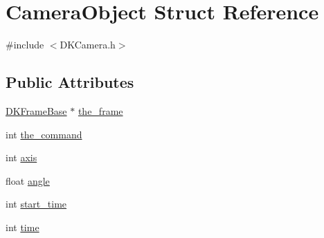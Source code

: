 \hypertarget{struct_camera_object}{\section{Camera\-Object Struct Reference}
\label{struct_camera_object}
}


{\ttfamily \#include $<$D\-K\-Camera.\-h$>$}

\subsection*{Public Attributes}
\begin{DoxyCompactItemize}
\item 
\hyperlink{class_d_k_frame_base}{D\-K\-Frame\-Base} $\ast$ \hyperlink{struct_camera_object_a1228779759d82950e5d15b6be7a060ab}{the\-\_\-frame}
\item 
int \hyperlink{struct_camera_object_aa190f23fb76e74c150b4ab9d8634d859}{the\-\_\-command}
\item 
int \hyperlink{struct_camera_object_acf2d2c620f1dadd7d066b93fc801723c}{axis}
\item 
float \hyperlink{struct_camera_object_ab02c981d766b44a1783be543b429daee}{angle}
\item 
int \hyperlink{struct_camera_object_ac670e7da3aa2804bc003a54d594d0c3d}{start\-\_\-time}
\item 
int \hyperlink{struct_camera_object_a56cecd92bdd7c9187656bad549a0543b}{time}
\end{DoxyCompactItemize}


